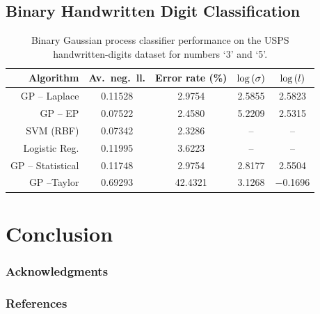 \documentclass{article} %
\begin{document}
\subsection{Binary Handwritten Digit Classification}

\begin{table}[htb]
    \centering
    \small
    \caption[]{Binary Gaussian process classifier performance on the USPS
        handwritten-digits dataset for numbers `3' and `5'.}
    \begin{tabular}{r| c c c c}
        Algorithm & Av.\ neg.\ ll. & Error rate (\%) 
            & $\log\left({\sigma}\right)$ & $\log\left({l}\right)$ \\
        \toprule
        GP -- Laplace & 0.11528 & 2.9754 & 2.5855 & 2.5823 \\
        GP -- EP & 0.07522 & 2.4580 & 5.2209 & 2.5315 \\
        SVM (RBF) & 0.07342 & 2.3286 & -- & -- \\
        Logistic Reg. & 0.11995 & 3.6223 & -- & -- \\
        \midrule
        GP -- Statistical & 0.11748 & 2.9754 &  2.8177 & 2.5504 \\
        GP --Taylor & 0.69293 & 42.4321 & 3.1268 & $-$0.1696 \\
        \bottomrule
    \end{tabular}
\end{table}

\section{Conclusion}

\subsubsection*{Acknowledgments}

\subsubsection*{References}
\printbibliography
\end{document}
